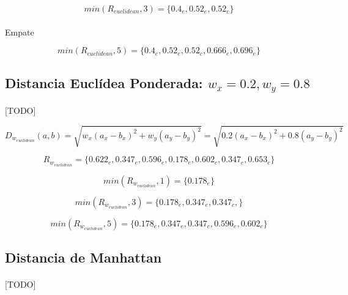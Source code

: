 \documentclass{article}
\begin{document}
			\begin{equation}
				min(R_{euclidean},3) = \{ 0.4_e, 0.52_e, 0.52_c\}
			\end{equation}

			\paragraph{}
			Empate

			\begin{equation}
				min(R_{euclidean},5) = \{ 0.4_e, 0.52_e, 0.52_c, 0.666_e,  0.696_e \}
			\end{equation}

		\subsection{Distancia Euclídea Ponderada: $w_x=0.2, w_y=0.8$}

			\paragraph{}
			[TODO]

			\begin{equation}
				D_{w_{euclidean}}(a,b) = \sqrt{w_x(a_x - b_x)^2 + w_y(a_y - b_y)^2} = \sqrt{0.2(a_x - b_x)^2 + 0.8(a_y - b_y)^2}
			\end{equation}

			\begin{equation}
				R_{w_{euclidean}} = \{0.622_e, 0.347_e, 0.596_e, 0.178_e, 0.602_c, 0.347_c, 0.653_c\}
			\end{equation}

			\begin{equation}
				min(R_{w_{euclidean}},1) = \{ 0.178_e \}
			\end{equation}

			\begin{equation}
				min(R_{w_{euclidean}},3) = \{ 0.178_e, 0.347_e, 0.347_c,\}
			\end{equation}

			\begin{equation}
				min(R_{w_{euclidean}},5) = \{ 0.178_e, 0.347_e, 0.347_c, 0.596_e, 0.602_c\}
			\end{equation}


		\subsection{Distancia de Manhattan}

			\paragraph{}
			[TODO]
\end{document}
